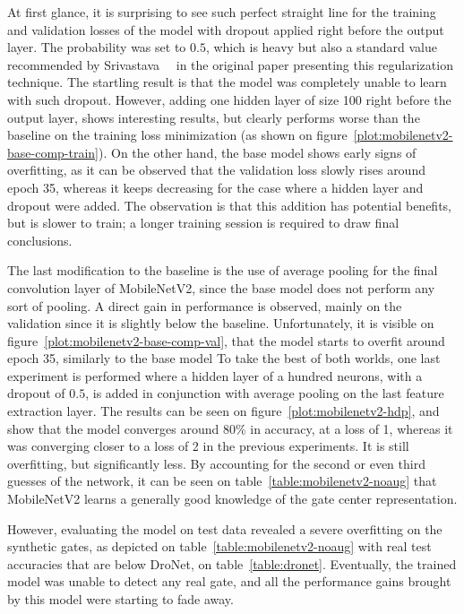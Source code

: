 

At first glance, it is surprising to see such perfect straight line for the
training and validation losses of the model with dropout applied right before
the output layer. The probability was set to $0.5$, which is heavy but also a
standard value recommended by Srivastava~\etal~\cite{Dropout} in the original
paper presenting this regularization technique. The startling result is that
the model was completely unable to learn with such dropout. However, adding one
hidden layer of size 100 right before the output layer, shows interesting
results, but clearly performs worse than the baseline on the training loss
minimization (as shown on figure~\ref{plot:mobilenetv2-base-comp-train}).  On
the other hand, the base model shows early signs of overfitting, as it can be
observed that the validation loss slowly rises around epoch 35, whereas it
keeps decreasing for the case where a hidden layer and dropout were added. The
observation is that this addition has potential benefits, but is slower to
train; a longer training session is required to draw final conclusions.

The last modification to the baseline is the use of average pooling for the
final convolution layer of MobileNetV2, since the base model does not perform
any sort of pooling. A direct gain in performance is observed, mainly on the
validation since it is slightly below the baseline. Unfortunately, it is
visible on figure~\ref{plot:mobilenetv2-base-comp-val}, that the model starts
to overfit around epoch 35, similarly to the base model 
To take the best of both worlds, one last experiment is performed where a
hidden layer of a hundred neurons, with a dropout of $0.5$, is added in
conjunction with average pooling on the last feature extraction layer. The
results can be seen on figure~\ref{plot:mobilenetv2-hdp}, and show that the
model converges around 80\% in accuracy, at a loss of 1, whereas it was
converging closer to a loss of 2 in the previous experiments. It is still
overfitting, but significantly less. By accounting for the second or even third
guesses of the network, it can be seen on table~\ref{table:mobilenetv2-noaug}
that MobileNetV2 learns a generally good knowledge of the gate center
representation.



However, evaluating the model on test data revealed a severe overfitting on the
synthetic gates, as depicted on table~\ref{table:mobilenetv2-noaug} with real
test accuracies that are below DroNet, on table~\ref{table:dronet}. Eventually,
the trained model was unable to detect any real gate, and all the performance
gains brought by this model were starting to fade away.

